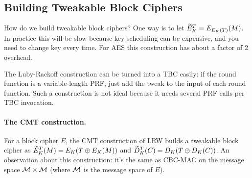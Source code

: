 \subsection*{Building Tweakable Block Ciphers} How do we build tweakable block ciphers? One way is to let $\widetilde{E}^{T}_{K} = E_{E_K(T)}(M)$. In practice this will be slow because key scheduling can be expensive, and you need to change key every time. For AES this construction has about a factor of 2 overhead.

The Luby-Rackoff construction can be turned into a TBC easily: if the round function is a variable-length PRF, just add the tweak to the input of each round function. Such a construction is not ideal because it needs several PRF calls per TBC invocation.

\paragraph{The CMT construction.} For a block cipher $E$, the CMT construction of LRW builds a tweakable block cipher as $\widetilde{E}^T_K(M) = E_K(T\oplus E_K(M))$ and $\widetilde{D}^T_K(C) = D_K(T\oplus D_K(C))$.
An observation about this construction: it's the same as CBC-MAC on the message space ${\cal M}\times{\cal M}$ (where ${\cal M}$ is the message space of $E$).

